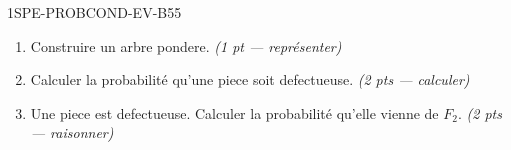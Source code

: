 \begin{evaluation}{1SPE-PROBCOND-EV-B}{55}
\begin{enumerate}
  \item Construire un arbre pondere.
  \hfill\textit{(1 pt --- représenter)}

  \item Calculer la probabilité qu'une piece soit defectueuse.
  \hfill\textit{(2 pts --- calculer)}

  \item Une piece est defectueuse. Calculer la probabilité qu'elle vienne de $F_2$.
  \hfill\textit{(2 pts --- raisonner)}
\end{enumerate}

\end{evaluation}
